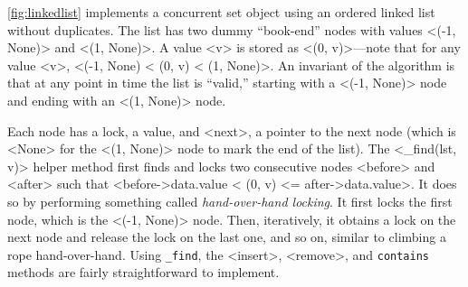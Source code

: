\documentclass{report}
\begin{document}
\autoref{fig:linkedlist} implements a concurrent set object using
an ordered linked list without duplicates.
The list has two dummy ``book-end'' nodes with values <{(-1, None)}> and
<{(1, None)}>.  A value <{v}> is stored as <{(0, v)}>---note that for
any value <{v}>, <{(-1, None) < (0, v) < (1, None)}>.
An invariant of the algorithm is that at any point in time the
list is ``valid,'' starting with a <{(-1, None)}> node and ending
with an <{(1, None)}> node.

%
Each node has a lock, a value, and <{next}>, a pointer to the next node
(which is <{None}> for the <{(1, None)}> node to mark the end of the list).
The <{_find(lst, v)}> helper method first
finds and locks two consecutive nodes <{before}> and <{after}>
such that <{before->data.value < (0, v) <= after->data.value}>.
It does so by performing something called \emph{hand-over-hand locking}.
It first locks the first node, which is the <{(-1, None)}> node.
Then, iteratively, it obtains a lock on the next node and release the
lock on the last one, and so on, similar to climbing a rope
hand-over-hand.
Using \texttt{\_find}, the <{insert}>, <{remove}>, and \texttt{contains}
methods are fairly straightforward to implement.

\end{document}
